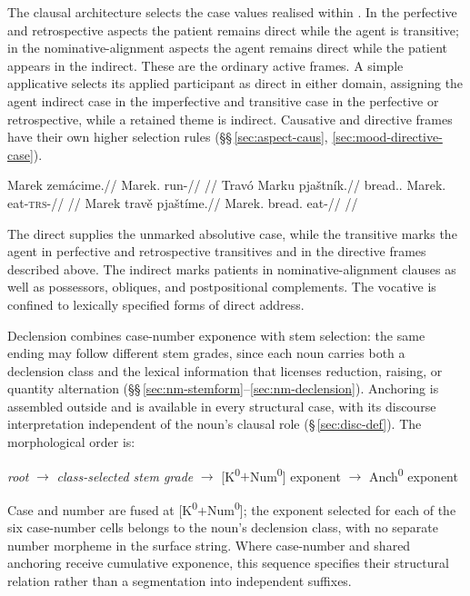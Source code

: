 The clausal architecture selects the case values realised within
. In the perfective and retrospective aspects the patient
remains direct while the agent is transitive; in the nominative-alignment
aspects the agent remains direct while the patient appears in the indirect.
These are the ordinary active frames. A simple applicative selects its applied
participant as direct in either domain, assigning the agent indirect case in
the imperfective and transitive case in the perfective or retrospective,
while a retained theme is indirect. Causative and directive frames have their
own higher selection rules (§§\,\ref{sec:aspect-caus},
\ref{sec:mood-directive-case}).

\pex
\a
\begingl
\gla Marek zemácime.//
\glb Marek.\Dir{} run-\Prog{}//
\glft {}//
\endgl
\a
\begingl
\gla Travó Marku pjaštník.//
\glb bread.\Dir{}.\Def{} Marek.\Trs{} eat-\textsc{trs}-\Pf{}//
\glft {}//
\endgl
\a
\begingl
\gla Marek travě pjaštíme.//
\glb Marek.\Dir{} bread.\Ind{} eat-\Prog{}//
\glft {}//
\endgl
\xe

The direct supplies the unmarked absolutive case, while the transitive marks the
agent in perfective and retrospective transitives and in the directive frames
described above. The indirect marks patients in nominative-alignment clauses
as well as possessors, obliques, and postpositional complements. The vocative is confined to lexically specified
forms of direct address.

Declension combines case-number exponence with stem selection: the same ending
may follow different stem grades, since each noun carries both a declension
class and the lexical information that licenses reduction, raising, or quantity
alternation (§§\,\ref{sec:nm-stemform}--\ref{sec:nm-declension}). Anchoring is
assembled outside  and is available in every structural case,
with its discourse interpretation independent of the noun's clausal role
(§\,\ref{sec:disc-def}). The morphological order is:

\medskip
\begin{center}
\textit{root} $\rightarrow$
\textit{class-selected stem grade} $\rightarrow$
[K\textsuperscript{0}$+$Num\textsuperscript{0}] exponent $\rightarrow$
Anch\textsuperscript{0} exponent
\end{center}
\medskip

\noindent Case and number are fused at [K\textsuperscript{0}$+$Num\textsuperscript{0}];
the exponent selected for each of the six case-number cells belongs to the
noun's declension class, with no separate number morpheme in the surface string.
Where case-number and shared anchoring receive cumulative exponence, this
sequence specifies their structural relation rather than a segmentation into
independent suffixes.


